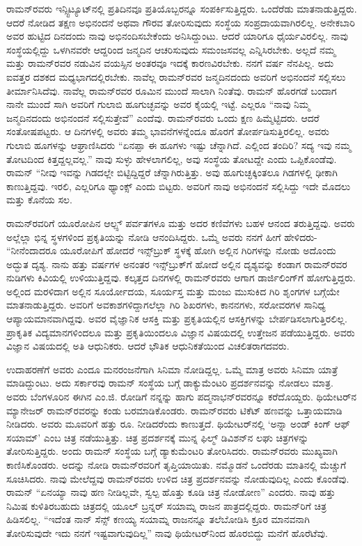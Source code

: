 ರಾಮನ್‌ರವರು ಇನ್ಸ್ಟಿಟ್ಯೂಟ್‌ನಲ್ಲಿ ಪ್ರತಿದಿನವೂ ಪ್ರತಿಯೊಬ್ಬರನ್ನೂ ಸಂಪರ್ಕಿಸುತ್ತಿದ್ದರು. ಒಂದೆರೆಡು ಮಾತನಾಡುತ್ತಿದ್ದರು. ಆದರೆ ನೋಡಿದ ತಕ್ಷಣ ಅಭಿನಂದನೆ ಅಥವಾ ಗೌರವ ತೋರಿಸುವುದು ಸಂಸ್ಥೆಯ ಸಂಪ್ರದಾಯವಾಗಿರಲಿಲ್ಲ. ಅನೇಕಬಾರಿ ಅವರ ಹುಟ್ಟಿದ ದಿನದಂದು ನಾವು ಅಭಿನಂದಿಸಬೇಕೆಂದು ಅನಿಸಿದ್ದುಂಟು. ಆದರೆ ಯಾರಿಗೂ ಧೈರ್ಯವಿರಲಿಲ್ಲ. ನಾವು ಸಂಸ್ಥೆಯಲ್ಲಿದ್ದು ಒಳಗಿನವರೇ ಆದ್ದರಿಂದ ಜನ್ಮದಿನ ಆಚರಿಸುವುದು ಸಮಂಜಸವಲ್ಲ ಎನ್ನಿಸಿರಬೇಕು. ಅಲ್ಲದೆ ನಮ್ಮ ಮತ್ತು ರಾಮನ್‌ರವರ ನಡುವಿನ ವಯಸ್ಸಿನ ಅಂತರವೂ ಇದಕ್ಕೆ ಕಾರಣವಿರಬೇಕು. ನನಗೆ ವರ್ಷ ನೆನಪಿಲ್ಲ. ಅದು ಐವತ್ತರ ದಶಕದ ಮಧ್ಯಭಾಗದಲ್ಲಿರಬೇಕು. ನಾವೆಲ್ಲ ರಾಮನ್‌ರವರ ಜನ್ಮದಿನದಂದು ಅವರಿಗೆ ಅಭಿನಂದನೆ ಸಲ್ಲಿಸಲು ತೀರ್ಮಾನಿಸಿದೆವು. ನಾವೆಲ್ಲ ರಾಮನ್‌ರವರ ರೂಮಿನ ಮುಂದೆ ಸಾಲಾಗಿ ನಿಂತೆವು. ರಾಮನ್ ಹೊರಗಡೆ ಬಂದಾಗ ನಾನೇ ಮುಂದೆ ಸಾಗಿ ಅವರಿಗೆ ಗುಲಾಬಿ ಹೂಗುಚ್ಛವನ್ನು ಅವರ ಕೈಯಲ್ಲಿ ಇಟ್ಟೆ. ಎಲ್ಲರೂ “ನಾವು ನಿಮ್ಮ ಜನ್ಮದಿನದಂದು ಅಭಿನಂದನೆ ಸಲ್ಲಿಸುತ್ತೇವೆ” ಎಂದೆವು. ರಾಮನ್‌ರವರು ಒಂದು ಕ್ಷಣ ಹಿಮ್ಮೆಟ್ಟಿದರು. ಆದರೆ ಸಂತೋಷಪಟ್ಟರು. ಆ ದಿನಗಳಲ್ಲಿ ಅವರು ತಮ್ಮ ಭಾವನೆಗಳನ್ನೆಂದೂ ಹೊರಗೆ ತೋರ್ಪಡಿಸುತ್ತಿರಲಿಲ್ಲ. ಅವರು ಗುಲಾಬಿ ಹೂಗಳನ್ನು ಆಘ್ರಾಣಿಸಿದರು “ಏನಪ್ಪಾ ಈ ಹೂಗಳು ಇಷ್ಟು ಚೆನ್ನಾಗಿದೆ. ಎಲ್ಲಿಂದ ತಂದಿರಿ? ಸದ್ಯ ಇವು ನಮ್ಮ ತೋಟದಿಂದ ಕಿತ್ತದ್ದಲ್ಲವಲ್ಲ.” ನಾವು ಸುಳ್ಳು ಹೇಳಲಾಗಲಿಲ್ಲ, ಅವು ಸಂಸ್ಥೆಯ ತೋಟದ್ದೇ ಎಂದು ಒಪ್ಪಿಕೊಂಡೆವು. ರಾಮನ್ “ನೀವು ಇವನ್ನು ಗಿಡದಲ್ಲೇ ಬಿಟ್ಟಿದ್ದಿದ್ದರೆ ಚೆನ್ನಾಗಿರುತ್ತಿತ್ತು. ಅವು ಹೂಗುಚ್ಛಕ್ಕಿಂತಲೂ ಗಿಡಗಳಲ್ಲಿ ಢೀಕಾಗಿ ಕಾಣುತ್ತಿದ್ದವು. ಇರಲಿ, ಎಲ್ಲರಿಗೂ ಥ್ಯಾಂಕ್ಸ್ ಎಂದು ಬಿಟ್ಟರು. ಅವರಿಗೆ ನಾವು ಅಭಿನಂದನೆ ಸಲ್ಲಿಸಿದ್ದು ಇದೇ ಮೊದಲು ಮತ್ತು ಕೊನೆಯ ಸಲ.

ರಾಮನ್‍ರವರಿಗೆ ಯೂರೋಪಿನ ಆಲ್ಪ್ಸ್ ಪರ್ವತಗಳೂ ಮತ್ತು ಅದರ ಕಣಿವೆಗಳು ಬಹಳ ಆನಂದ ತರುತ್ತಿದ್ದವು. ಅವರು ಅಲ್ಲೆಲ್ಲಾ ಭಿನ್ನ ಸ್ಥಳಗಳಿಂದ ಪ್ರಕೃತಿಯನ್ನು ನೋಡಿ ಆನಂದಿಸಿದ್ದರು. ಒಮ್ಮೆ ಅವರು ನನಗೆ ಹೀಗೆ ಹೇಳಿದರು- “ನೀನೆಂದಾದರೂ ಯೂರೋಪಿಗೆ ಹೋದರೆ ಇನ್ಸ್‌ಬ್ರುಕ್ ಸ್ಥಳಕ್ಕೆ ಹೋಗಿ ಅಲ್ಲಿನ ಗಿರಿಗಳನ್ನು ನೋಡು ಅದೊಂದು ಅದ್ಭುತ ದೃಶ್ಯ. ನಾನು ಹತ್ತು ವರ್ಷಗಳ ಅನಂತರ ಇನ್ಸ್‌ಬ್ರುಕ್‌ಗೆ ಹೋದೆ ಅಲ್ಲಿನ ದೃಶ್ಯವನ್ನು ಕಂಡಾಗ ರಾಮನ್‌ರವರ ನುಡಿಗಳು ಕಿವಿಯಲ್ಲಿ ಉಳಿಯುತ್ತಿದ್ದವು. ಕಲ್ಕತ್ತದ ದಿನಗಳಲ್ಲಿ ರಾಮನ್‌ರವರು ಆಗಾಗ ಡಾರ್ಜಿಲಿಂಗ್‌ಗೆ ಹೋಗುತ್ತಿದ್ದರು. ಅಲ್ಲಿಂದ ಮರಳಿದಾಗ ಅಲ್ಲಿನ ಸೂರ್ಯೋದಯ, ಸೂರ್ಯಸ್ತ ಮತ್ತು ಮಂಜು ಮುಸುಕಿದ ಗಿರಿ ಶೃಂಗಗಳ ಬಗ್ಗೆಯೇ ಮಾತನಾಡುತ್ತಿದ್ದರು. ಅವರಿಗೆ ಅವಕಾಶಗಳಿದ್ದಾಗಲೆಲ್ಲಾ ಗಿರಿ ಶಿಖರಗಳು, ಕಾನನಗಳು, ಸರೋವರಗಳ ಸಾನಿಧ್ಯ ಆಪ್ಯಾಯಮಾನವಾಗಿದ್ದವು. ಅವರ ವೈಜ್ಞಾನಿಕ ಆಸಕ್ತಿ ಮತ್ತು ಪ್ರಕೃತಿಯಲ್ಲಿನ ಆಸಕ್ತಿಗಳನ್ನು ಬೇರ್ಪಡಿಸಲಾಗುತ್ತಿರಲಿಲ್ಲ. ಪ್ರಾಕೃತಿಕ ವಿದ್ಯಮಾನಗಳಿಂದಲೂ ಮತ್ತು ಪ್ರಕೃತಿಯಿಂದಲೂ ವಿಜ್ಞಾನ ವಿಷಯದಲ್ಲಿ ಉತ್ತೇಜನ ಪಡೆಯುತ್ತಿದ್ದರು. ಅವರು ವಿಜ್ಞಾನ ವಿಷಯದಲ್ಲಿ ಅತಿ ಆಧುನಿಕರು. ಆದರೆ ಭೌತಿಕ ಆಧುನಿಕತೆಯಿಂದ ವಿಚಲಿತರಾಗದವರು.

ಉದಾಹರಣೆಗೆ ಅವರು ಎಂದೂ ಮನರಂಜನೆಗಾಗಿ ಸಿನಿಮಾ ನೋಡಿದ್ದಲ್ಲ. ಒಮ್ಮೆ ಮಾತ್ರ ಅವರು ಸಿನಿಮಾ ಯಾತ್ರೆ ಮಾಡಿದ್ದುಂಟು. ಅದು ಸರ್ಕಾರವು ರಾಮನ್ ಸಂಸ್ಥೆಯ ಬಗ್ಗೆ ಡಾಕ್ಯುಮೆಂಟರಿ ಪ್ರದರ್ಶನವನ್ನು ನೋಡಲು ಮಾತ್ರ. ಅವರು ಬೆಂಗಳೂರಿನ ಈಗಿನ ಎಂ.ಜಿ. ರೋಡಿಗೆ ನನ್ನನ್ನು ಹಾಗು ಪದ್ಮನಾಭನ್‌ರವರನ್ನೂ ಕರೆದೊಯ್ದರು. ಥಿಯೇಟರ್‌ನ ಮ್ಯಾನೇಜರ್ ರಾಮನ್‌ರವರನ್ನು ಕಂಡು ಬರಮಾಡಿಕೊಂಡರು. ರಾಮನ್‌ರವರು ಟಿಕೆಟ್ ಹಣವನ್ನು ಒತ್ತಾಯಮಾಡಿ ನೀಡಿದರು. ಅವರು ಮೂವರಿಗೆ ಹತ್ತು ರೂ. ನೀಡಿದರೆಂದು ಕಾಣುತ್ತದೆ. ಥಿಯೇಟರ್‌ನಲ್ಲಿ ‘ಅನ್ನಾ ಅಂಡ್ ಕಿಂಗ್ ಆಫ್ ಸಯಾಮ್’ ಎಂಬ ಚಿತ್ರ ನಡೆಯುತ್ತಿತ್ತು. ಚಿತ್ರ ಪ್ರದರ್ಶನಕ್ಕೆ ಮುನ್ನ ಫಿಲ್ಮ್ ಡಿವಿಶನ್‌ನ ಲಘು ಚಿತ್ರಗಳನ್ನು ತೋರಿಸುತ್ತಿದ್ದರು. ಅಂದು ರಾಮನ್ ಸಂಸ್ಥೆಯ ಬಗ್ಗೆ ಡ್ಯಾಕುಮೆಂಟರಿ ತೋರಿಸಿದರು. ರಾಮನ್‌ರವರು ಮುಖ್ಯವಾಗಿ ಕಾಣಿಸಿಕೊಂಡರು. ಅದನ್ನು ನೋಡಿ ರಾಮನ್‍ರವರಿಗೆ ತೃಪ್ತಿಯಾಯಿತು. ನಮ್ಮೊಡನೆ ಒಂದೆರಡು ಮಾತಿನಲ್ಲಿ ಮೆಚ್ಚುಗೆ ಸೂಚಿಸಿದರು. ನಾವು ಮೇಲೆದ್ದವು ರಾಮನ್‌ರವರು ಉಳಿದ ಚಿತ್ರ ಪ್ರದರ್ಶನವನ್ನು ನೋಡುವುದಿಲ್ಲ ಎಂದು ಕೊಂಡೆವು. ರಾಮನ್ “ಏನಯ್ಯಾ ನಾವು ಹಣ ನೀಡಿಲ್ಲವೇ, ಸ್ವಲ್ಪ ಹೊತ್ತು ಕೂಡಿ ಚಿತ್ರ ನೋಡೋಣ” ಎಂದರು. ನಾವು ಹತ್ತು ನಿಮಿಷ ಕುಳಿತಿರಬಹುದು ಚಿತ್ರದಲ್ಲಿ ಯೂಲ್ ಬ್ರನ್ನರ್ ಸಯಾಮ್ನ ರಾಜನ ಪಾತ್ರದಲ್ಲಿದ್ದರು. ರಾಮನ್‌ರಿಗೆ ಚಿತ್ರ ಹಿಡಿಸಲಿಲ್ಲ. “ಇದೆಂತ ನಾನ್ ಸೆನ್ಸ್ ಕಣಯ್ಯ ಸಯಾಮ್ನ ರಾಜನನ್ನೂ ತಲೆಬೋಡಿಸಿ ಕ್ರೂರ ಮಾನವನಾಗಿ ತೋರಿಸುವುದೇ ಇದು ನನಗೆ ಇಷ್ಟವಾಗುವುದಿಲ್ಲ” ನಾವು ಥಿಯೇಟರ್‌ನಿಂದ ಹೊರಬಿದ್ದು ಮನೆಗೆ ಹೊರೆಟೆವು.

